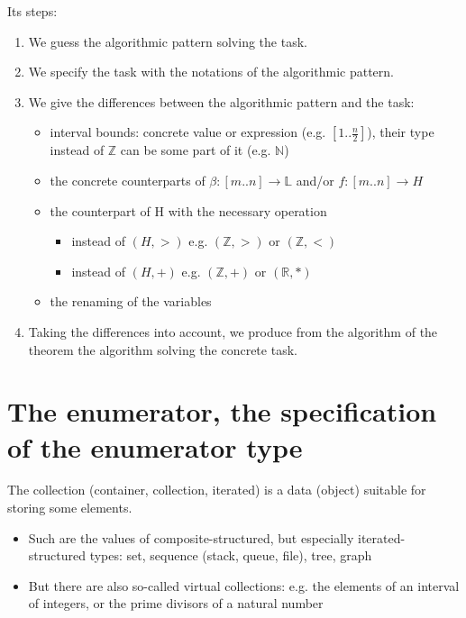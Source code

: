 \documentclass[margin=0px]{article}
\begin{document}
\noindent Its steps:
\begin{enumerate}
    \item	We guess the algorithmic pattern solving the task.
    \item	We specify the task with the notations of the algorithmic pattern.
    \item	We give the differences between the algorithmic pattern and the task:
          \begin{itemize}
              \item	interval bounds: concrete value or expression (e.g. $[1..\frac{n}{2}]$),
                    their type instead of $\mathbb{Z}$ can be some part of it (e.g. $\mathbb{N}$)

              \item	the concrete counterparts of $\beta:[m..n] \to \mathbb{L}$ and/or $f:[m..n] \to H$

              \item	the counterpart of H with the necessary operation
                    \begin{itemize}
                        \item	instead of $(H,>)$ e.g. $(\mathbb{Z},>)$ or $(\mathbb{Z},<)$
                        \item	instead of $(H,+)$ e.g. $(\mathbb{Z},+)$ or $(\mathbb{R},*)$
                    \end{itemize}
              \item	the renaming of the variables
          \end{itemize}
    \item	Taking the differences into account, we produce from the algorithm of the theorem the algorithm solving the concrete task.
\end{enumerate}

\section{The enumerator, the specification of the enumerator type}

The collection (container, collection, iterated) is a data
(object) suitable for storing some elements.
\begin{itemize}
    \item	Such are the values of composite-structured, but especially iterated-structured
          types: set, sequence (stack, queue, file), tree, graph

    \item	But there are also so-called virtual collections: e.g. the elements of an interval
          of integers, or the prime divisors of a natural number
\end{itemize}
\end{document}
